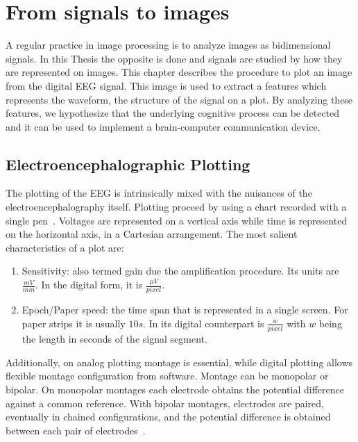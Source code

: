 \chapter{From signals to images}
\label{chapter:two}


A regular practice in image processing is to analyze images as bidimensional signals.  In this Thesis the opposite is done and signals are studied by how they are represented on images. This chapter describes the procedure to plot an image from the digital EEG signal.  This image is used to extract a features which represents the waveform, the structure of the signal on a plot.  By analyzing these features, we hypothesize that the underlying cognitive process can be detected and it can be used to implement a brain-computer communication device.

\section{Electroencephalographic Plotting}

The plotting of the EEG is intrinsically mixed with the nuisances of the electroencephalography itself.  Plotting proceed by using a chart recorded with a single pen~\cite{Jestico1977}.   Voltages are represented on a vertical axis while time is represented on the horizontal axis, in a Cartesian arrangement.  The most salient characteristics of a plot are:

\begin{enumerate}
\item Sensitivity: also termed gain due the amplification procedure.  Its units are $ \frac{mV}{mm}$.  In the digital form, it is $\frac{\mu V}{pixel}$.
\item Epoch/Paper speed: the time span that is represented in a single screen.  For paper strips it is usually $10s$.  In its digital counterpart is $ \frac{w}{pixel}$ with $w$ being the length in seconds of the signal segment.
\end{enumerate}

Additionally, on analog plotting montage is essential, while digital plotting allows flexible montage configuration from software.  Montage can be monopolar or bipolar.  On monopolar montages each electrode obtains the potential difference against a common reference. With bipolar montages, electrodes are paired, eventually in chained configurations, and the potential difference is obtained between each pair of electrodes~\cite{EEGIntro}.

